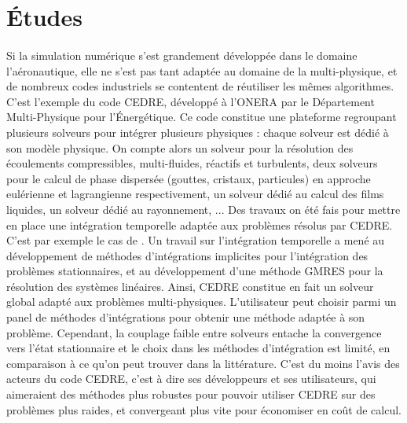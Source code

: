   \section*{Études}

    \paragraph{}
    Si la simulation numérique s'est grandement développée dans le domaine l'aéronautique, elle ne s'est pas tant adaptée au domaine de la multi-physique, et de nombreux codes industriels se contentent de réutiliser les mêmes algorithmes.
    C'est l'exemple du code CEDRE, développé à l'ONERA par le Département Multi-Physique pour l'Énergétique.
    Ce code constitue une plateforme regroupant plusieurs solveurs pour intégrer plusieurs physiques : chaque solveur est dédié à son modèle physique.
    On compte alors un solveur pour la résolution des écoulements compressibles, multi-fluides, réactifs et turbulents, deux solveurs pour le calcul de phase dispersée (gouttes, cristaux, particules) en approche eulérienne et lagrangienne respectivement, un solveur dédié au calcul des films liquides, un solveur dédié au rayonnement, ...
    Des travaux on été fais pour mettre en place une intégration temporelle adaptée aux problèmes résolus par CEDRE.
    C'est par exemple le cas de \cite{Selva1998}.
    Un travail sur l'intégration temporelle a mené au développement de méthodes d'intégrations implicites pour l'intégration des problèmes stationnaires, et au développement d'une méthode GMRES pour la résolution des systèmes linéaires.
    Ainsi, CEDRE constitue en fait un solveur global adapté aux problèmes multi-physiques.
    L'utilisateur peut choisir parmi un panel de méthodes d'intégrations pour obtenir une méthode adaptée à son problème.
    Cependant, la couplage faible entre solveurs entache la convergence vers l'état stationnaire et le choix dans les méthodes d'intégration est limité, en comparaison à ce qu'on peut trouver dans la littérature.
    C'est du moins l'avis des acteurs du code CEDRE, c'est à dire ses développeurs et ses utilisateurs, qui aimeraient des méthodes plus robustes pour pouvoir utiliser CEDRE sur des problèmes plus raides, et convergeant plus vite pour économiser en coût de calcul.

